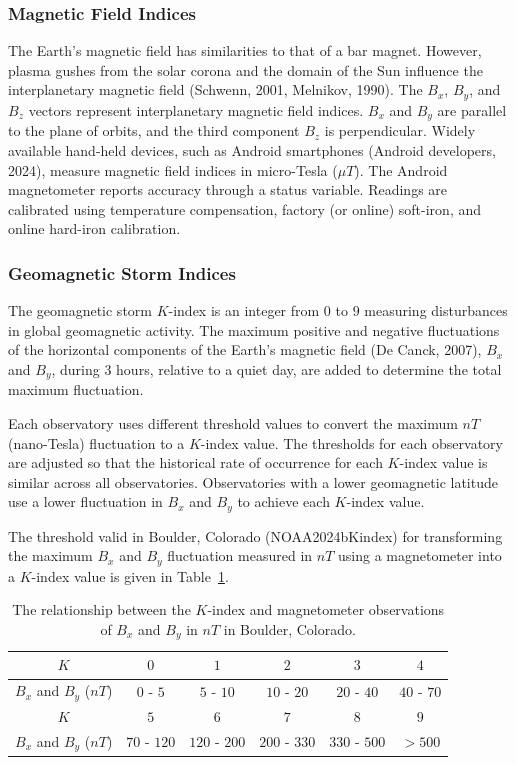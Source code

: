 \documentclass[sn-mathphys-num]{sn-jnl}%
\begin{document}
\subsubsection{Magnetic Field Indices}

The Earth's magnetic field has similarities to that of a bar magnet. However, plasma gushes from the solar corona and the domain of the Sun influence the interplanetary magnetic field (Schwenn, 2001, Melnikov, 1990). The $B_{x}$, $B_{y}$, and $B_{z}$ vectors represent interplanetary magnetic field indices. $B_{x}$ and $B_{y}$ are parallel to the plane of orbits, and the third component $B_{z}$ is perpendicular. Widely available hand-held devices, such as Android smartphones (Android developers, 2024), measure magnetic field indices in micro-Tesla ($\mu T$). The Android magnetometer reports accuracy through a status variable. Readings are calibrated using temperature compensation, factory (or online) soft-iron, and online hard-iron calibration.
 
\subsubsection{Geomagnetic Storm Indices}

The geomagnetic storm $K$-index is an integer from $0$ to $9$ measuring disturbances in global geomagnetic activity. The maximum positive and negative fluctuations of the horizontal components of the Earth's magnetic field (De Canck, 2007), $B_{x}$ and $B_{y}$, during $3$ hours, relative to a quiet day, are added to determine the total maximum fluctuation.

Each observatory uses different threshold values to convert the maximum $nT$ (nano-Tesla) fluctuation to a $K$-index value. The thresholds for each observatory are adjusted so that the historical rate of occurrence for each $K$-index value is similar across all observatories. Observatories with a lower geomagnetic latitude use a lower fluctuation in $B_{x}$ and $B_{y}$ to achieve each $K$-index value. 

The threshold valid in Boulder, Colorado (NOAA2024bKindex) for transforming the maximum $B_{x}$ and $B_{y}$ fluctuation measured in $nT$ using a magnetometer into a $K$-index value is given in Table~\ref{tab:K}.

\begin{table}[!ht]
    \centering
    \caption{The relationship between the $K$-index and  magnetometer observations of $B_{x}$ and $B_{y}$ in $nT$ in Boulder, Colorado.}
    \label{tab:K}
    \begin{tabular}{|c|c|c|c|c|c|}
        \hline
        $K$ & $0$ & $1$ & $2$ & $3$ & $4$ \\ \hline
        $B_{x}$ and $B_{y}$ ($nT$)& $0$ - $5$ & $5$ - $10$ & $10$ - $20$ & $20$ - $40$ & $40$ - $70$ \\ \hline
        $K$ & $5$ & $6$ & $7$ & $8$ & $9$ \\ \hline
        $B_{x}$ and $B_{y}$ ($nT$) & $70$ - $120$ & $120$ - $200$ & $200$ - $330$ & $330$ - $500$ & $>500$ \\ \hline
    \end{tabular}
\end{table}
\end{document}
